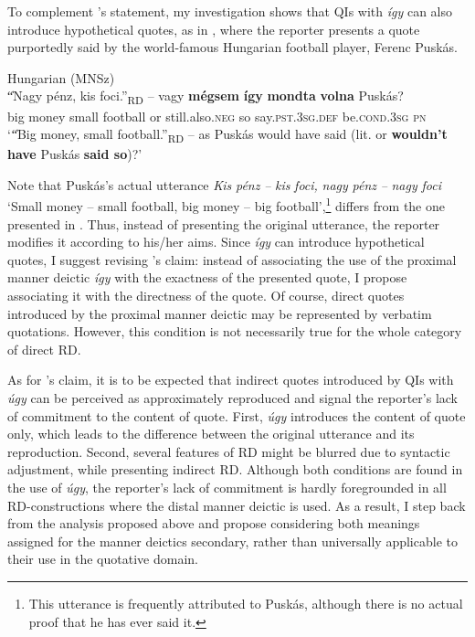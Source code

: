 \documentclass[output=paper,colorlinks,citecolor=brown]{langscibook}
\begin{document}
To complement \citeauthor{Kiefer2016}’s statement, my investigation shows that QIs with \textit{így} can also introduce hypothetical quotes, as in , where the reporter presents a quote purportedly said by the world-famous Hungarian football player, Ferenc Puskás.

\ea\label{ex:teptiuk:26} {Hungarian (MNSz)}\\
\gll \|“Nagy pénz, kis foci.”\|\textsubscript{RD}  –  vagy \textbf{mégsem} \textbf{így} \textbf{mondta} \textbf{volna} Puskás?\\
{\db}{\db}big money small football {} or still.also.\textsc{neg} so say.\textsc{pst.3sg.def} be\textsc{.cond.3sg} \textsc{pn}\\
\glt ‘\|“Big money, small football.”\|\textsubscript{RD}  – as Puskás would have said (lit. or \textbf{wouldn’t have} Puskás \textbf{said so})?’
\z

Note that Puskás’s actual utterance \textit{Kis} \textit{pénz} \textit{–} \textit{kis} \textit{foci,} \textit{nagy} \textit{pénz} \textit{–} \textit{nagy} \textit{foci} ‘Small money – small football, big money – big football’,\footnote{This utterance is frequently attributed to Puskás, although there is no actual proof that he has ever said it.} differs from the one presented in . Thus, instead of presenting the original utterance, the reporter modifies it according to his/her aims. Since \textit{így} can introduce hypothetical quotes, I suggest revising \citeauthor{Kiefer2016}’s claim: instead of associating the use of the proximal manner deictic \textit{így} with the exactness of the presented quote, I propose associating it with the directness of the quote. Of course, direct quotes introduced by the proximal manner deictic may be represented by verbatim quotations. However, this condition is not necessarily true for the whole category of direct RD.

As for \citeauthor{Körtvély2016}’s claim, it is to be expected that indirect quotes introduced by QIs with \textit{úgy} can be perceived as approximately reproduced and signal the reporter’s lack of commitment to the content of quote. First, \textit{úgy} introduces the content of quote only, which leads to the difference between the original utterance and its reproduction. Second, several features of RD might be blurred due to syntactic adjustment, while presenting indirect RD. Although both conditions are found in the use of \textit{úgy}, the reporter’s lack of commitment is hardly foregrounded in all RD-constructions where the distal manner deictic is used. As a result, I step back from the analysis proposed above and propose considering both meanings assigned for the manner deictics secondary, rather than universally applicable to their use in the quotative domain.
\end{document}

